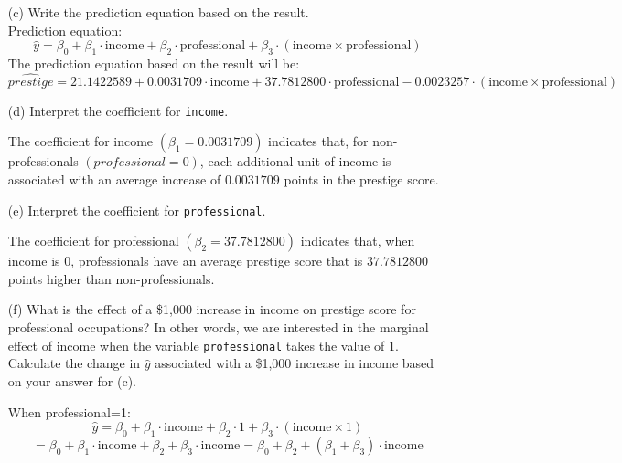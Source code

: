 \documentclass[12pt,letterpaper]{article}
\begin{document}
\begin{enumerate}
\newpage
	\item [(c)]
	Write the prediction equation based on the result.\\
	
	\vspace{.5cm}
	Prediction equation:
	$$
	\hat{y} = \beta_0 + \beta_1 \cdot \text{income} + \beta_2 \cdot \text{professional} + \beta_3 \cdot (\text{income} \times \text{professional})
	$$
	\vspace{.5cm}
	The prediction equation based on the result will be:\\
	$$
	\hat{prestige} = 21.1422589 + 0.0031709\cdot \text{income} + 37.7812800 \cdot \text{professional} - 0.0023257 \cdot (\text{income} \times \text{professional})
	$$
	 
    \vspace{.5cm}
	\item [(d)]
	Interpret the coefficient for \texttt{income}.
	
	\vspace{.5cm}
	The coefficient for income $(\beta_1 = 0.0031709)$ indicates that, for non-professionals 
	$(professional = 0)$, each additional unit of income is associated with an average 
	increase of $0.0031709$ points in the prestige score.
	\vspace{.5cm}
	
	\item [(e)]
	Interpret the coefficient for \texttt{professional}.
	
	\vspace{.5cm}
	The coefficient for professional $(\beta_2 = 37.7812800)$ indicates that, when income is 
	$0$, professionals have an average prestige score that is $37.7812800$ points higher than non-professionals.
    \vspace{.5cm}
    
	\item [(f)]
	What is the effect of a \$1,000 increase in income on prestige score for professional occupations? In other words, we are interested in the marginal effect of income when the variable \texttt{professional} takes the value of $1$. Calculate the change in $\hat{y}$ associated with a \$1,000 increase in income based on your answer for (c).
	
	\vspace{.5cm}
	When professional=1:
	$$
	\hat{y} = \beta_0 + \beta_1 \cdot \text{income} + \beta_2 \cdot 1 + \beta_3 \cdot (\text{income} \times 1)
	$$
	$$
	= \beta_0 + \beta_1 \cdot \text{income} + \beta_2 + \beta_3 \cdot \text{income} = \beta_0 + \beta_2 + (\beta_1 + \beta_3) \cdot \text{income}
	$$
	

\end{enumerate}
\end{document}

